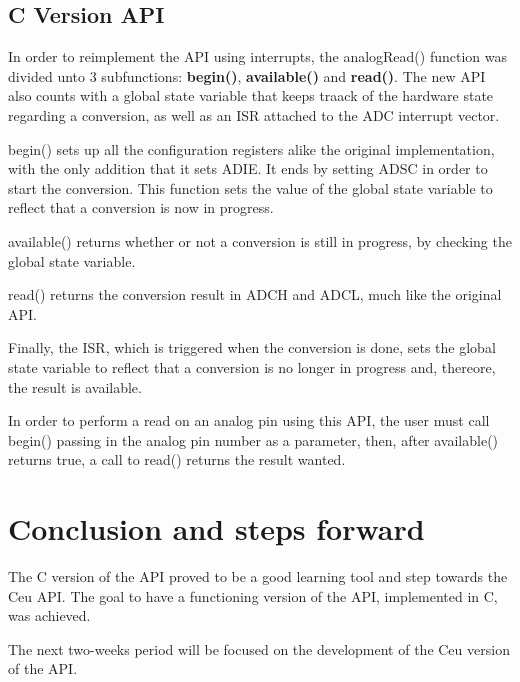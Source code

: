 \documentclass{article}
\begin{document}
\subsection{C Version API}
\tab In order to reimplement the API using interrupts, the analogRead() function was divided unto 3 subfunctions: \textbf{begin()}, \textbf{available()} and \textbf{read()}. The new API also counts with a global state variable that keeps traack of the hardware state regarding a conversion, as well as an ISR attached to the ADC interrupt vector.
\par begin() sets up all the configuration registers alike the original implementation, with the only addition that it sets ADIE. It ends by setting ADSC in order to start the conversion. This function sets the value of the global state variable to reflect that a conversion is now in progress.
\par available() returns whether or not a conversion is still in progress, by checking the global state variable.
\par read() returns the conversion result in ADCH and ADCL, much like the original API.
\par Finally, the ISR, which is triggered when the conversion is done, sets the global state variable to reflect that a conversion is no longer in progress and, thereore, the result is available.
\par In order to perform a read on an analog pin using this API, the user must call begin() passing in the analog pin number as a parameter, then, after available() returns true, a call to read() returns the result wanted.
  
\section{Conclusion and steps forward}
\tab The C version of the API proved to be a good learning tool and step towards the Ceu API. The goal to have a functioning version of the API, implemented in C, was achieved.
\par The next two-weeks period will be focused on the development of the Ceu version of the API.
\end{document}
